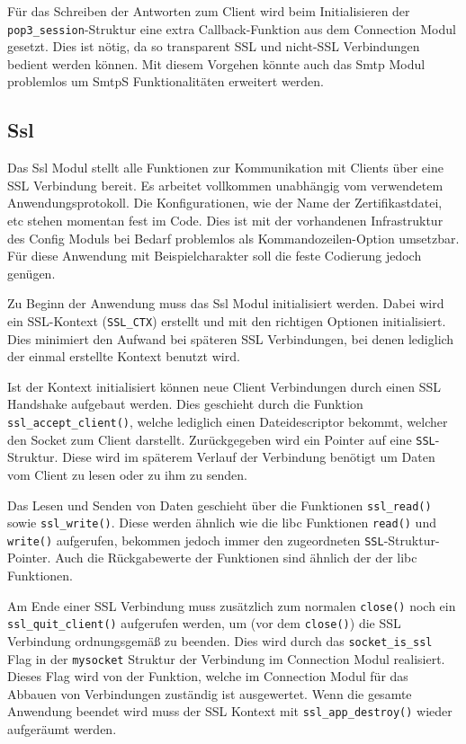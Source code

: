 \documentclass[final,a4paper,11pt,notitlepage,halfparskip]{scrreprt}
\begin{document}
Für das Schreiben der Antworten zum Client wird beim Initialisieren der
\texttt{pop3\_session}-Struktur eine extra Callback-Funktion aus dem Connection
Modul gesetzt. Dies ist nötig, da so transparent SSL und nicht-SSL Verbindungen
bedient werden können. Mit diesem Vorgehen könnte auch das Smtp Modul problemlos
um SmtpS Funktionalitäten erweitert werden.


\subsection{Ssl}
Das Ssl Modul stellt alle Funktionen zur Kommunikation mit Clients über eine SSL
Verbindung bereit. Es arbeitet vollkommen unabhängig vom verwendetem
Anwendungsprotokoll. Die Konfigurationen, wie der Name der Zertifikastdatei, etc
stehen momentan fest im Code. Dies ist mit der vorhandenen Infrastruktur des
Config Moduls bei Bedarf problemlos als Kommandozeilen-Option umsetzbar. Für
diese Anwendung mit Beispielcharakter soll die feste Codierung jedoch genügen.

Zu Beginn der Anwendung muss das Ssl Modul initialisiert werden. Dabei wird ein
SSL-Kontext (\texttt{SSL\_CTX}) erstellt und mit den richtigen Optionen
initialisiert. Dies minimiert den Aufwand bei späteren SSL Verbindungen, bei
denen lediglich der einmal erstellte Kontext benutzt wird.

Ist der Kontext initialisiert können neue Client Verbindungen durch einen SSL
Handshake aufgebaut werden. Dies geschieht durch die Funktion
\texttt{ssl\_accept\_client()}, welche lediglich einen Dateidescriptor bekommt,
welcher den Socket zum Client darstellt. Zurückgegeben wird ein Pointer auf eine
\texttt{SSL}-Struktur. Diese wird im späterem Verlauf der Verbindung benötigt um
Daten vom Client zu lesen oder zu ihm zu senden.

Das Lesen und Senden von Daten geschieht über die Funktionen \texttt{ssl\_read()}
sowie \texttt{ssl\_write()}. Diese werden ähnlich wie die libc Funktionen
\texttt{read()} und \texttt{write()} aufgerufen, bekommen jedoch immer den
zugeordneten \texttt{SSL}-Struktur-Pointer. Auch die Rückgabewerte der Funktionen
sind ähnlich der der libc Funktionen.

Am Ende einer SSL Verbindung muss zusätzlich zum normalen \texttt{close()} noch
ein \\
\texttt{ssl\_quit\_client()} aufgerufen werden, um (vor dem \texttt{close()}) die 
SSL Verbindung ordnungsgemäß zu beenden. Dies wird durch das 
\texttt{socket\_is\_ssl} Flag in der \texttt{mysocket} Struktur der Verbindung
im Connection Modul realisiert. Dieses Flag wird von der Funktion, welche im
Connection Modul für das Abbauen von Verbindungen zuständig ist ausgewertet.
Wenn die gesamte Anwendung beendet wird muss der SSL Kontext mit
\texttt{ssl\_app\_destroy()} wieder aufgeräumt werden. 
\end{document}
